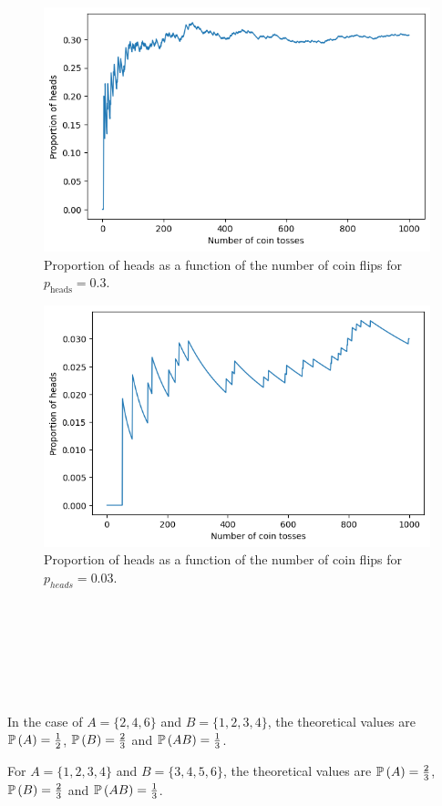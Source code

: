 \begin{ex}~
  \inputminted{python}{../code/ex01_21.py}

  \begin{figure}[H]
    \centering
    \includegraphics{../images/01-21a}
    \caption{Proportion of heads as a function of the number of coin flips for
      $p_\text{heads}=0.3$.}
  \end{figure}

  \begin{figure}[H]
    \centering
    \includegraphics{../images/01-21b}
    \caption{Proportion of heads as a function of the number of coin flips for
      $p_{heads}=0.03$.}
  \end{figure}

\end{ex}

\begin{ex}~
  \inputminted{python}{../code/ex01_22.py}
  \inputminted{text}{../output/ex01_22.txt}
\end{ex}

\begin{ex}~
  \inputminted{python}{../code/ex01_23.py}
  \inputminted{text}{../output/ex01_23.txt}

  In the case of $A=\{2, 4, 6\}$ and $B=\{1, 2, 3, 4\}$, the theoretical values
  are $\P{A}=\frac{1}{2}$, $\P{B}=\frac{2}{3}$ and $\P{AB}=\frac{1}{3}$.

  For $A=\{1, 2, 3, 4\}$ and $B=\{3, 4, 5, 6\}$, the theoretical values are
  $\P{A}=\frac{2}{3}$, $\P{B}=\frac{2}{3}$ and $\P{AB}=\frac{1}{3}$.
\end{ex}